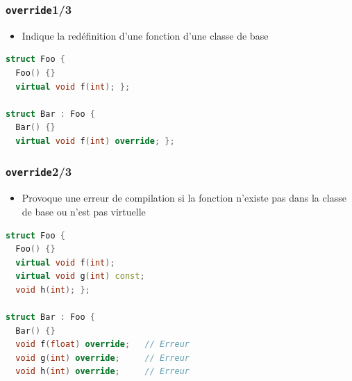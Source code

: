 \documentclass[C++.tex]{subfiles}
\begin{document}
\begin{frame}[fragile]
	\frametitle{\lstinline|override|\titlehfill{}1/3}
	\begin{itemize}
		\item Indique la redéfinition d'une fonction d'une classe de base
	\end{itemize}

	\begin{lstlisting}[language=C++]
struct Foo {
  Foo() {}
  virtual void f(int); };

struct Bar : Foo {
  Bar() {}
  virtual void f(int) override; };
\end{lstlisting}
\end{frame}

\begin{frame}[fragile]
	\frametitle{\lstinline|override|\titlehfill{}2/3}
	\begin{itemize}
		\item Provoque une erreur de compilation si la fonction n'existe pas dans la classe de base ou n'est pas virtuelle
	\end{itemize}

	\begin{lstlisting}[language=C++]
struct Foo {
  Foo() {}
  virtual void f(int); 
  virtual void g(int) const;
  void h(int); };

struct Bar : Foo {
  Bar() {}
  void f(float) override;   // Erreur 
  void g(int) override;     // Erreur
  void h(int) override;     // Erreur\end{lstlisting}
\end{frame}
\end{document}
